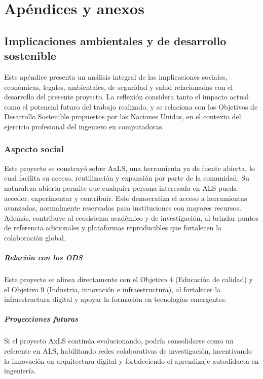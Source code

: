 \chapter{Apéndices y anexos}

\section{Implicaciones ambientales y de desarrollo sostenible}

Este apéndice presenta un análisis integral de las implicaciones sociales,
económicas, legales, ambientales, de seguridad y salud relacionadas con el
desarrollo del presente proyecto. La reflexión considera tanto el impacto
actual como el potencial futuro del trabajo realizado, y se relaciona con los
Objetivos de Desarrollo Sostenible propuestos por las Naciones Unidas, en el
contexto del ejercicio profesional del ingeniero en computadoras.

\subsection{Aspecto social}

Este proyecto se construyó sobre AxLS, una herramienta ya de fuente abierta, lo
cual facilita su acceso, reutilización y expansión por parte de la comunidad.
Su naturaleza abierta permite que cualquier persona interesada en ALS pueda acceder, experimentar y contribuir. Esto
democratiza el acceso a herramientas avanzadas, normalmente reservadas para
instituciones con mayores recursos. Además, contribuye al ecosistema académico
y de investigación, al brindar puntos de referencia adicionales y plataformas
reproducibles que fortalecen la colaboración global.

\paragraph{Relación con los ODS}
Este proyecto se alinea directamente con el Objetivo 4 (Educación de calidad) y
el Objetivo 9 (Industria, innovación e infraestructura), al fortalecer la
infraestructura digital y apoyar la formación en tecnologías emergentes.

\paragraph{Proyecciones futuras}
Si el proyecto AxLS continúa evolucionando, podría consolidarse como un
referente en ALS, habilitando redes colaborativas de investigación,
incentivando la innovación en arquitectura digital y fortaleciendo el
aprendizaje autodidacta en ingeniería.

